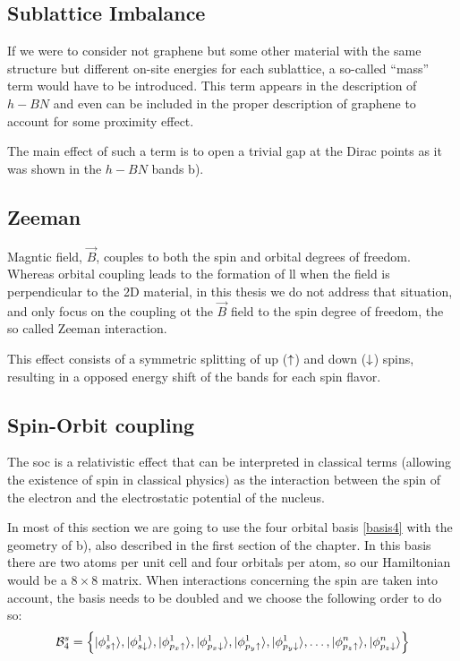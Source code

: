 \subsection{Sublattice Imbalance}
If we were to consider not graphene but some other material with the same structure but different on-site energies for each sublattice, a so-called ``mass'' term would have to be introduced. This term appears in the description of $h-BN$ and even can be included in the proper description of graphene to account for some proximity effect.

The main effect of such a term is to open a trivial gap at the Dirac points as it was shown in the $h-BN$ bands b).

\subsection{Zeeman}
Magntic field, $\vec{B}$, couples to both the spin and orbital degrees of freedom. Whereas orbital coupling leads to the formation of \ac{ll} when the field is perpendicular to the 2D material, in this thesis we do not address that situation, and only focus on the coupling ot the $\vec{B}$ field to the spin degree of freedom, the so called Zeeman interaction.

 
This effect consists of a symmetric splitting of up ($\uparrow$) and down ($\downarrow$) spins, resulting in a opposed energy shift of the bands for each spin flavor. %

\subsection{Spin-Orbit coupling}
\label{sec:soc}
The \acf{soc} is a relativistic effect that can be interpreted in classical terms (allowing the existence of spin in classical physics) as the interaction between the spin of the electron and the electrostatic potential of the nucleus.

In most of this section we are going to use the four orbital basis \eqref{basis4} with the geometry of b), also described in the first section of the chapter.
In this basis there are two atoms per unit cell and four orbitals per atom, so our Hamiltonian would be a $8\times8$ matrix. When interactions concerning the spin are taken into account, the basis needs to be doubled and we choose the following order to do so:
\begin{equation}
  \mathcal{B}^{s}_4 = \left\{
  |\phi^1_{s\uparrow}\rangle,
  |\phi^1_{s\downarrow}\rangle,
  |\phi^1_{p_x\uparrow}\rangle,
  |\phi^1_{p_x\downarrow}\rangle,
  |\phi^1_{p_y\uparrow}\rangle,
  |\phi^1_{p_y\downarrow}\rangle,
  \dots,
  |\phi^n_{p_z\uparrow}\rangle,
  |\phi^n_{p_z\downarrow}\rangle
  \right\}
\label{basis4spin}
\end{equation}

